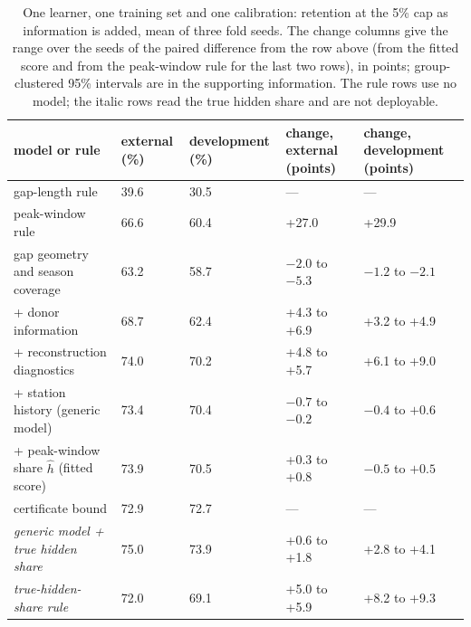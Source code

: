 \documentclass[draft]{agujournal2025}
\newcommand{\tabletext}{%
  \footnotesize
  \setlength{\baselineskip}{10pt}%
  \setlength{\parindent}{0pt}%
}
\begin{document}
\begin{table}
\caption{One learner, one training set and one calibration: retention at the 5\%
cap as information is added, mean of three fold seeds. The change columns give
the range over the seeds of the paired difference from the row above (from the
fitted score and from the peak-window rule for the last two rows), in points;
group-clustered 95\% intervals are in the supporting information. The rule rows
use no model; the italic rows read the true hidden share and are not
deployable.}
\label{tab:ladder}
\tabletext
\centering
\begin{tabularx}{\textwidth}{Y{1.9}Z{0.7}Z{0.7}Y{0.85}Y{0.85}}
\hline
model or rule & external (\%) & development (\%) & change, external (points) & change, development (points) \\
\hline
gap-length rule & 39.6 & 30.5 & --- & --- \\
peak-window rule & 66.6 & 60.4 & +27.0 & +29.9 \\
gap geometry and season coverage & 63.2 & 58.7 & $-2.0$ to $-5.3$ & $-1.2$ to $-2.1$ \\
\quad + donor information & 68.7 & 62.4 & +4.3 to +6.9 & +3.2 to +4.9 \\
\quad + reconstruction diagnostics & 74.0 & 70.2 & +4.8 to +5.7 & +6.1 to +9.0 \\
\quad + station history (generic model) & 73.4 & 70.4 & $-0.7$ to $-0.2$ & $-0.4$ to $+0.6$ \\
\quad + peak-window share $\hat h$ (fitted score) & 73.9 & 70.5 & +0.3 to +0.8 & $-0.5$ to $+0.5$ \\
certificate bound & 72.9 & 72.7 & --- & --- \\
\textit{generic model + true hidden share} & 75.0 & 73.9 & +0.6 to +1.8 & +2.8 to +4.1 \\
\textit{true-hidden-share rule} & 72.0 & 69.1 & +5.0 to +5.9 & +8.2 to +9.3 \\
\hline
\end{tabularx}
\end{table}
\end{document}
